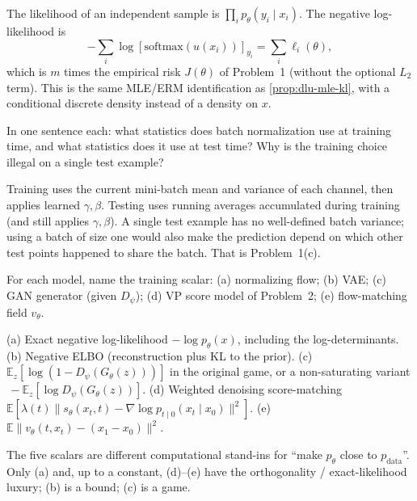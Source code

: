 \begin{solution}
The likelihood of an independent sample is \(\prod_i p_\theta(y_i\mid x_i)\). The negative log-likelihood is
\[
-\sum_i\log[\mathrm{softmax}(u(x_i))]_{y_i}
=
\sum_i\ell_i(\theta),
\]
which is \(m\) times the empirical risk \(J(\theta)\) of Problem~1 (without the optional \(L_2\) term). This is the same MLE/ERM identification as \cref{prop:dlu-mle-kl}, with a conditional discrete density instead of a density on \(x\).
\end{solution}

\begin{exercise}
\label{ex:dlu-bn-line}
In one sentence each: what statistics does batch normalization use at training time, and what statistics does it use at test time? Why is the training choice illegal on a single test example?
\end{exercise}

\begin{solution}
Training uses the current mini-batch mean and variance of each channel, then applies learned \(\gamma,\beta\). Testing uses running averages accumulated during training (and still applies \(\gamma,\beta\)). A single test example has no well-defined batch variance; using a batch of size one would also make the prediction depend on which other test points happened to share the batch. That is Problem~1(c).
\end{solution}

\begin{exercise}
\label{ex:dlu-which-obj}
For each model, name the training scalar: (a) normalizing flow; (b) VAE; (c) GAN generator (given \(D_\psi\)); (d) VP score model of Problem~2; (e) flow-matching field \(v_\theta\).
\end{exercise}

\begin{solution}
(a) Exact negative log-likelihood \(-\log p_\theta(x)\), including the log-determinants.
(b) Negative ELBO (reconstruction plus KL to the prior).
(c) \(\mathbb{E}_z[\log(1-D_\psi(G_\theta(z)))]\) in the original game, or a non-saturating variant \(\,-\mathbb{E}_z[\log D_\psi(G_\theta(z))]\).
(d) Weighted denoising score-matching \(\mathbb{E}[\lambda(t)\|s_\theta(x_t,t)-\nabla\log p_{t\mid 0}(x_t\mid x_0)\|^2]\).
(e) \(\mathbb{E}\|v_\theta(t,x_t)-(x_1-x_0)\|^2\).

The five scalars are different computational stand-ins for ``make \(p_\theta\) close to \(p_{\mathrm{data}}\)''. Only (a) and, up to a constant, (d)--(e) have the orthogonality / exact-likelihood luxury; (b) is a bound; (c) is a game.
\end{solution}

